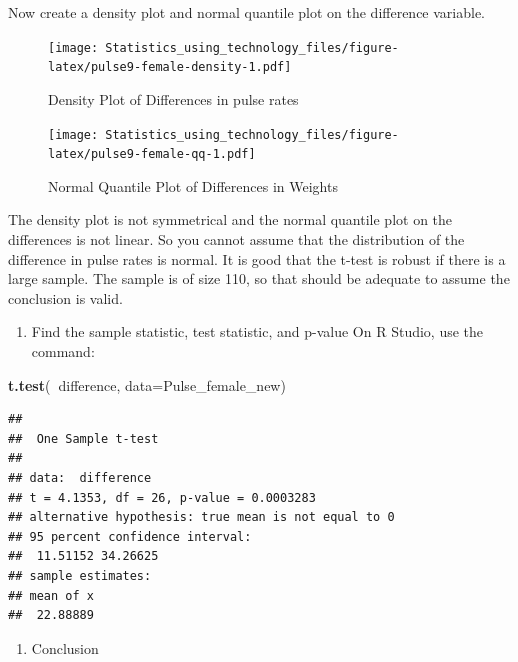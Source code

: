 \documentclass[
]{book}
\newenvironment{Shaded}{\begin{snugshade}}{\end{snugshade}}
\newcommand{\DataTypeTok}[1]{\textcolor[rgb]{0.13,0.29,0.53}{#1}}
\newcommand{\KeywordTok}[1]{\textcolor[rgb]{0.13,0.29,0.53}{\textbf{#1}}}
\newcommand{\NormalTok}[1]{#1}
\newcommand{\OperatorTok}[1]{\textcolor[rgb]{0.81,0.36,0.00}{\textbf{#1}}}
\providecommand{\tightlist}{%
  \setlength{\itemsep}{0pt}\setlength{\parskip}{0pt}}
\begin{document}
Now create a density plot and normal quantile plot on the difference variable.



\begin{figure}
\centering
\texttt{[image: Statistics\_using\_technology\_files/figure-latex/pulse9-female-density-1.pdf]}
\caption{\label{fig:pulse9-female-density}Density Plot of Differences in pulse rates}
\end{figure}



\begin{figure}
\centering
\texttt{[image: Statistics\_using\_technology\_files/figure-latex/pulse9-female-qq-1.pdf]}
\caption{\label{fig:pulse9-female-qq}Normal Quantile Plot of Differences in Weights}
\end{figure}

The density plot is not symmetrical and the normal quantile plot on the differences is not linear.
So you cannot assume that the distribution of the difference in pulse rates is normal. It is good that the t-test is robust if there is a large sample. The sample is of size 110, so that should be adequate to assume the conclusion is valid.

\begin{enumerate}
\def\labelenumi{\arabic{enumi}.}
\setcounter{enumi}{3}
\tightlist
\item
  Find the sample statistic, test statistic, and p-value
  On R Studio, use the command:
\end{enumerate}

\begin{Shaded}
\begin{Highlighting}[]
\KeywordTok{t.test}\NormalTok{(}\OperatorTok{~}\NormalTok{difference, }\DataTypeTok{data=}\NormalTok{Pulse_female_new)}
\end{Highlighting}
\end{Shaded}

\begin{verbatim}
## 
## 	One Sample t-test
## 
## data:  difference
## t = 4.1353, df = 26, p-value = 0.0003283
## alternative hypothesis: true mean is not equal to 0
## 95 percent confidence interval:
##  11.51152 34.26625
## sample estimates:
## mean of x 
##  22.88889
\end{verbatim}

\begin{enumerate}
\def\labelenumi{\arabic{enumi}.}
\setcounter{enumi}{4}
\tightlist
\item
  Conclusion
\end{enumerate}
\end{document}
